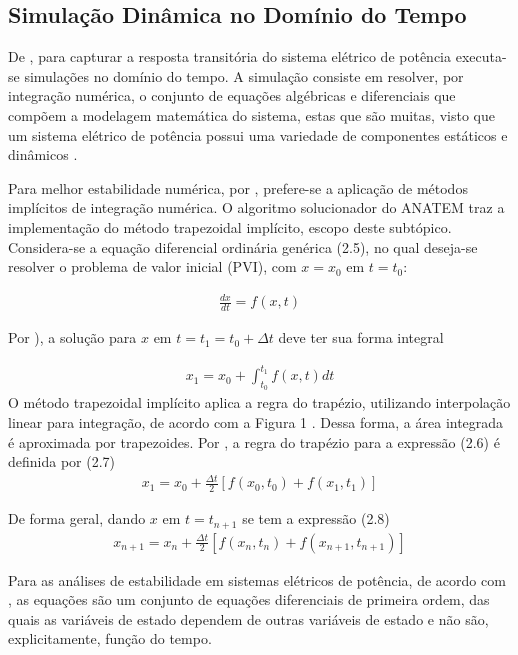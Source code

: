 \documentclass[12pt,oneside,a4paper,chapter=TITLE,section=TITLE,sumario=tradicional,english,brazil]{abntex2}
\begin{document}
\subsection{Simulação Dinâmica no Domínio do Tempo}
De \textcite{ajjarapu2011}, para capturar a resposta transitória do sistema elétrico de potência executa-se simulações no domínio do tempo.  A simulação consiste em resolver, por integração numérica, o conjunto de equações algébricas e diferenciais que compõem a modelagem matemática do sistema, estas que são muitas, visto que um sistema elétrico de potência possui uma variedade de componentes estáticos e dinâmicos \cite{ajjarapu2011}.\par 
Para melhor estabilidade numérica, por \textcite{ajjarapu2011}, prefere-se a aplicação de métodos implícitos de integração numérica. O algoritmo solucionador do ANATEM traz a implementação do método trapezoidal implícito, escopo deste subtópico.
Considera-se a equação diferencial ordinária genérica (2.5), no qual deseja-se resolver o problema de valor inicial (PVI), com $x=x_{0}$ em $t=t_{0}$:\par 
\begin{gather}
\frac{dx}{dt}=f(x,t)
\end{gather}
\par  
Por \textcite{kundur1994}), a solução para $x$ em $t=t_{1}=t_{0}+\Delta t$ deve ter sua forma integral\par 
\begin{gather}
x_{1}=x_{0}+\int_{t_{0}}^{t_{1}}f(x,t)dt
\end{gather}
O método trapezoidal implícito aplica a regra do trapézio, utilizando interpolação linear para integração, de acordo com a Figura 1 \cite{kundur1994}. Dessa forma, a área integrada é aproximada por trapezoides. Por \textcite{kundur1994}, a regra do trapézio para a expressão (2.6) é definida por (2.7)
\begin{gather}
x_{1}=x_{0}+\frac{\Delta t}{2}[f(x_{0},t_{0})+f(x_{1},t_{1})]
\end{gather}
\par 
De forma geral, dando $x$ em $t=t_{n+1}$ se tem a expressão (2.8)
\begin{gather}
x_{n+1}=x_{n}+\frac{\Delta t}{2}[f(x_{n},t_{n})+f(x_{n+1},t_{n+1})]
\end{gather}
\par 
Para as análises de estabilidade em sistemas elétricos de potência, de acordo com \textcite{kundur1994}, as equações são um conjunto de equações diferenciais de primeira ordem, das quais as variáveis de estado dependem de outras variáveis de estado e não são, explicitamente, função do tempo.\par
\end{document}
